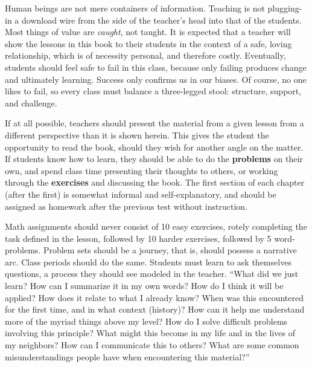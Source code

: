 
Human beings are not mere containers of information.  Teaching is not plugging-in
a download wire from the side of the teacher's head into that of the students.  Most
things of value are \emph{caught}, not taught.  It is expected that a teacher will show the 
lessons in this book to their students in the context of a safe, loving relationship, which
is of necessity personal, and therefore costly.  Eventually, students should feel safe to
fail in this class, because only failing produces change and ultimately learning.  Success
only confirms us in our biases.
Of course, no one likes to fail, so every class must balance a three-legged stool: structure, 
support, and challenge.

If at all possible, teachers should present the material from a given lesson from a different
perspective than it is shown herein.  This gives the student the opportunity to read the book,
should they wish for another angle on the matter.  If students know how to learn, they should
be able to do the \textbf{problems} on their own, and spend class time presenting their 
thoughts to others, or working through the \textbf{exercises} and discussing the book.  
The first section of each chapter (after the first) is somewhat informal and self-explanatory, 
and should be assigned as homework after the previous test without instruction.

Math assignments should never consist of 10 easy exercises, rotely completing the task defined
in the lesson, followed by 10 harder exercises, followed by 5 word-problems.  Problem sets
should be a journey, that is, should possess a narrative arc.  Class periods should do the same.
Students must learn to ask themselves questions, a process they should see modeled in the
teacher.
``What did we just learn?  How can I summarize it in my own words?  How do I think it
will be applied?  How does it relate to what I already know?  When was this encountered
for the first time, and in what context (history)? How can it help me 
understand more of the myriad things above my level?  How do I solve difficult problems
involving this principle? What might this become in my life and in the lives of my
neighbors?  How can I communicate this to others?  What are some common misunderstandings
people have when encountering this material?''

